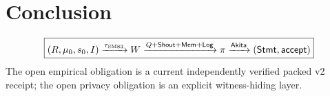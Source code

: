 \documentclass[10pt]{article}
\numberwithin{equation}{section}
\newcommand{\Stmt}{\mathsf{Stmt}}
\begin{document}
\section{Conclusion}

\begin{equation}
 \boxed{
 (R,\mu_0,s_0,I)
 \xrightarrow{\tau_{\rm SM83}}
 W
 \xrightarrow{Q+\mathsf{Shout}+\mathsf{Mem}+\mathsf{Log}}
 \pi
 \xrightarrow{\mathsf{Akita}}
 (\Stmt,\mathsf{accept})}
\end{equation}
The open empirical obligation is a current independently verified packed v2 receipt; the open
privacy obligation is an explicit witness-hiding layer.


\sloppy

\end{document}
